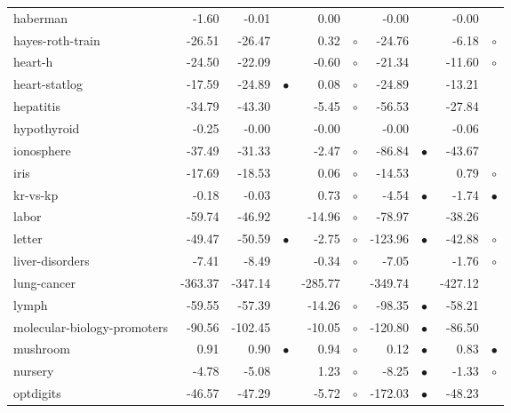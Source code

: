 {\begin{longtable}{lrr@{\hspace{0.1cm}}cr@{\hspace{0.1cm}}cr@{\hspace{0.1cm}}cr@{\hspace{0.1cm}}c}
haberman &   -1.60 &   -0.01 &           &    0.00 &          &   -0.00 &           &   -0.00 &          \\
hayes-roth-train &  -26.51 &  -26.47 &           &    0.32 &  $\circ$ &  -24.76 &           &   -6.18 &   $\circ$\\
heart-h &  -24.50 &  -22.09 &           &   -0.60 &  $\circ$ &  -21.34 &           &  -11.60 &   $\circ$\\
heart-statlog &  -17.59 &  -24.89 & $\bullet$ &    0.08 &  $\circ$ &  -24.89 &           &  -13.21 &          \\
hepatitis &  -34.79 &  -43.30 &           &   -5.45 &  $\circ$ &  -56.53 &           &  -27.84 &          \\
hypothyroid &   -0.25 &   -0.00 &           &   -0.00 &          &   -0.00 &           &   -0.06 &          \\
ionosphere &  -37.49 &  -31.33 &           &   -2.47 &  $\circ$ &  -86.84 & $\bullet$ &  -43.67 &          \\
iris &  -17.69 &  -18.53 &           &    0.06 &  $\circ$ &  -14.53 &           &    0.79 &   $\circ$\\
kr-vs-kp &   -0.18 &   -0.03 &           &    0.73 &  $\circ$ &   -4.54 & $\bullet$ &   -1.74 & $\bullet$\\
labor &  -59.74 &  -46.92 &           &  -14.96 &  $\circ$ &  -78.97 &           &  -38.26 &          \\
letter &  -49.47 &  -50.59 & $\bullet$ &   -2.75 &  $\circ$ & -123.96 & $\bullet$ &  -42.88 &   $\circ$\\
liver-disorders &   -7.41 &   -8.49 &           &   -0.34 &  $\circ$ &   -7.05 &           &   -1.76 &   $\circ$\\
lung-cancer & -363.37 & -347.14 &           & -285.77 &          & -349.74 &           & -427.12 &          \\
lymph &  -59.55 &  -57.39 &           &  -14.26 &  $\circ$ &  -98.35 & $\bullet$ &  -58.21 &          \\
molecular-biology-promoters &  -90.56 & -102.45 &           &  -10.05 &  $\circ$ & -120.80 & $\bullet$ &  -86.50 &          \\
mushroom &    0.91 &    0.90 & $\bullet$ &    0.94 &  $\circ$ &    0.12 & $\bullet$ &    0.83 & $\bullet$\\
nursery &   -4.78 &   -5.08 &           &    1.23 &  $\circ$ &   -8.25 & $\bullet$ &   -1.33 &   $\circ$\\
optdigits &  -46.57 &  -47.29 &           &   -5.72 &  $\circ$ & -172.03 & $\bullet$ &  -48.23 &          \\

\end{longtable}}
